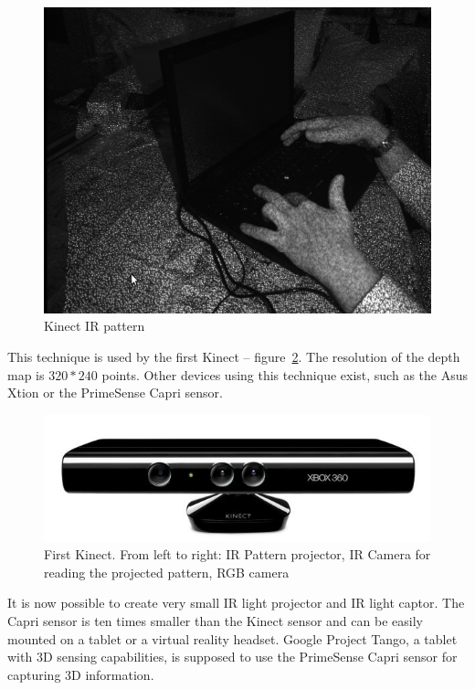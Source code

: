 \documentclass[12pt]{article}
\begin{document}
\begin{figure}[h]
  \centering
  \includegraphics[scale=0.3]{Kinect-ir-image.png}
  \caption{\label{kinectir} Kinect IR pattern}
\end{figure}

This technique is used by the first Kinect -- figure~\ref{kinect}. The resolution of the depth map is $320*240$ points. Other devices using this technique exist, such as the Asus Xtion or the PrimeSense Capri sensor.

\begin{figure}[h]
  \centering
  \includegraphics[scale=0.3]{kinect1.jpg}
  \caption{\label{kinect} First Kinect. From left to right: IR Pattern projector, IR Camera for reading the projected pattern, RGB camera}
\end{figure}

It is now possible to create very small IR light projector and IR light captor. The Capri sensor is ten times smaller than the Kinect sensor and can be easily mounted on a tablet or a virtual reality headset. Google Project Tango, a tablet with 3D sensing capabilities, is supposed to use the PrimeSense Capri sensor for capturing 3D information.
\end{document}
